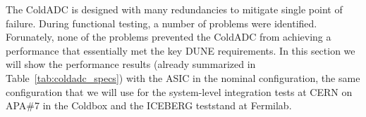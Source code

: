 \label{sec:4.}


The ColdADC is designed with many redundancies to mitigate single point of failure. During functional testing, a number of 
problems were identified. Forunately, none of the problems prevented the ColdADC from achieving a performance that 
essentially met the key DUNE requirements. In this section we will show the performance results (already summarized 
in Table~\ref{tab:coldadc_specs}) with the ASIC in the nominal configuration, the same configuration that we will 
use for the system-level integration tests at CERN on APA\#7 in the Coldbox and the ICEBERG teststand at Fermilab.
